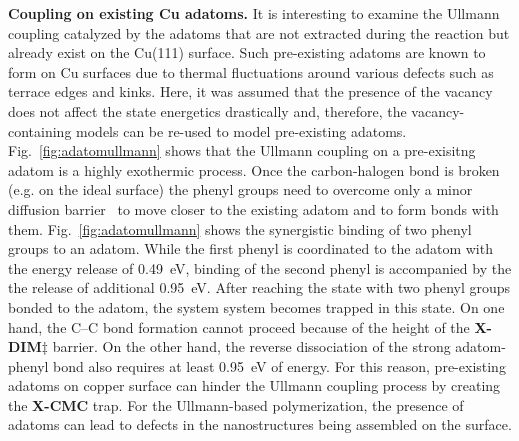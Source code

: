 \documentclass[aps,prb,reprint,amsmath,amssymb]{revtex4-1}
\newcommand{\lock}{\color{red}}
\newcommand{\lock}{\color{black}}
\begin{document}
{\lock

\textbf{Coupling on existing Cu adatoms.} It is interesting to examine the Ullmann coupling catalyzed by the adatoms that are not extracted during the reaction but already exist on the Cu(111) surface. Such pre-existing adatoms are known to form on Cu surfaces due to thermal fluctuations around various defects such as terrace edges and kinks. Here, it was assumed that the presence of the vacancy does not affect the state energetics drastically and, therefore, the vacancy-containing models can be re-used to model pre-existing adatoms. Fig.~\ref{fig:adatomullmann} shows that the Ullmann coupling on a pre-exisitng adatom is a highly exothermic process. Once the carbon-halogen bond is broken (e.g. on the ideal surface) the phenyl groups need to overcome only a minor diffusion barrier~\cite{pccp2010} to move closer to the existing adatom and to form bonds with them. 
%
%
Fig.~\ref{fig:adatomullmann} shows the synergistic binding of two phenyl groups to an adatom. While the first phenyl is coordinated to the adatom with the energy release of \SI{0.49}{\electronvolt}, binding of the second phenyl is accompanied by the the release of additional \SI{0.95}{\electronvolt}. 
%
After reaching the state with two phenyl groups bonded to the adatom, the system system becomes trapped in this state. On one hand, the C--C bond formation cannot proceed because of the height of the \textbf{X-DIM$\ddagger$} barrier. On the other hand, the reverse dissociation of the strong adatom-phenyl bond also requires at least \SI{0.95}{\electronvolt} of energy. For this reason, pre-existing adatoms on copper surface can hinder the Ullmann coupling process by creating the \textbf{X-CMC} trap. For the Ullmann-based polymerization, the presence of adatoms can lead to defects in the nanostructures being assembled on the surface.

}

\ifdefined\INTERNAL
\end{document}
